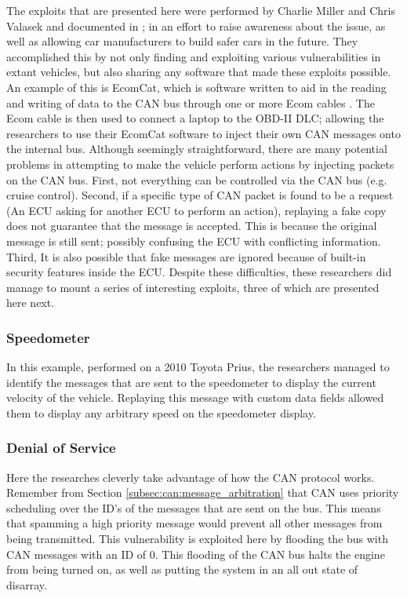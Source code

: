 The exploits that are presented here were performed by Charlie Miller and Chris Valasek and documented in \cite{MillerC}; in an effort to raise awareness about the issue, as well as allowing car manufacturers to build safer cars in the future. They accomplished this by not only finding and exploiting various vulnerabilities in extant vehicles, but also sharing any software that made these exploits possible. An example of this is EcomCat, which is software written to aid in the reading and writing of data to the CAN bus through one or more Ecom cables \cite{MillerC}. The Ecom cable is then used to connect a laptop to the OBD-II DLC; allowing the researchers to use their EcomCat software to inject their own CAN messages onto the internal bus. Although seemingly straightforward, there are many potential problems in attempting to make the vehicle perform actions by injecting packets on the CAN bus. First, not everything can be controlled via the CAN bus (e.g. cruise control). Second, if a specific type of CAN packet is found to be a request (An ECU asking for another ECU to perform an action), replaying a fake copy does not guarantee that the message is accepted. This is because the original message is still sent; possibly confusing the ECU with conflicting information. Third, It is also possible that fake messages are ignored because of built-in security features inside the ECU. Despite these difficulties, these researchers did manage to mount a series of interesting exploits, three of which are presented here next.

\subsubsection{Speedometer} 
\label{subsubsec:speedometer}

In this example, performed on a 2010 Toyota Prius, the researchers managed to identify the messages that are sent to the speedometer to display the current velocity of the vehicle. Replaying this message with custom data fields allowed them to display any arbitrary speed on the speedometer display.

\subsubsection{Denial of Service} 
\label{subsubsec:denial_of_service}

Here the researches cleverly take advantage of how the CAN protocol works. Remember from Section \ref{subsec:can:message_arbitration} that CAN uses priority scheduling over the ID's of the messages that are sent on the bus. This means that spamming a high priority message would prevent all other messages from being transmitted. This vulnerability is exploited here by flooding the bus with CAN messages with an ID of 0. This flooding of the CAN bus halts the engine from being turned on, as well as putting the system in an all out state of disarray.

